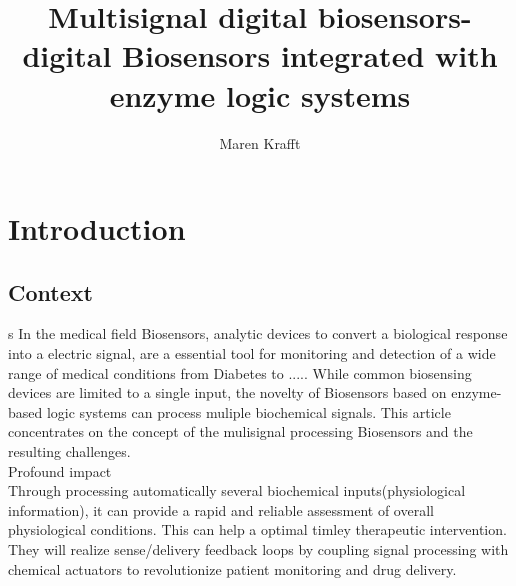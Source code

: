\documentclass[runningheads]{llncs}
\begin{document}
\title{Multisignal digital biosensors- digital Biosensors integrated with enzyme logic systems}
\author{Maren Krafft}
\maketitle        

      
\begin{abstract}
	




\end{abstract}

\section{Introduction}

\subsection{Context}
s
	In the medical field Biosensors, analytic devices to convert a biological response into a electric signal, are a essential tool for monitoring and detection of a wide range of medical conditions from Diabetes to .....
	While common biosensing devices are limited to a single input, the novelty of Biosensors based on enzyme-based logic systems can process muliple biochemical signals. This article concentrates on the concept of the mulisignal processing Biosensors and the resulting challenges.\\
	
	Profound impact\\
	
	Through processing automatically several biochemical inputs(physiological information), it can provide a rapid and reliable assessment of overall physiological conditions. This can help a optimal timley therapeutic intervention. They will realize sense/delivery feedback loops by coupling signal processing with chemical actuators to revolutionize patient monitoring and drug delivery. 
	
\end{document}
